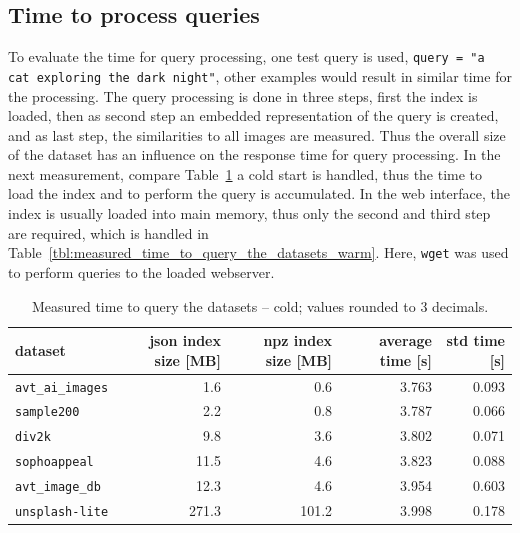 \documentclass{article}
\begin{document}
\subsection{Time to process queries}
To evaluate the time for query processing, one test query is used, \texttt{query = "a cat exploring the dark night"}, other examples would result in similar time for the processing.
The query processing is done in three steps, first the index is loaded, then as second step an embedded representation of the query is created, and as last step, the similarities to all images are measured.
Thus the overall size of the dataset has an influence on the response time for query processing.
In the next measurement, compare Table~\ref{tbl:measured_time_to_query_the_datasets_cold} a cold start is handled, thus the time to load the index and to perform the query is accumulated.
In the web interface, the index is usually loaded into main memory, thus only the second and third step are required, which is handled in Table~\ref{tbl:measured_time_to_query_the_datasets_warm}.
Here, \texttt{wget} was used to perform queries to the loaded webserver.

\begin{table}[htb!]
\centering
\caption{Measured time to query the datasets -- cold; values rounded to 3 decimals.}
\label{tbl:measured_time_to_query_the_datasets_cold}
\begin{tabular}{lrrrr}
\toprule
dataset                  & json index size [MB] & npz index size [MB] & average time [s] & std time [s]  \\
\midrule
\texttt{avt\_ai\_images} & 1.6                  & 0.6                 & 3.763            & 0.093 \\
\texttt{sample200}       & 2.2                  & 0.8                 & 3.787            & 0.066 \\
\texttt{div2k}           & 9.8                  & 3.6                 & 3.802            & 0.071 \\
\texttt{sophoappeal}     & 11.5                 & 4.6                 & 3.823            & 0.088 \\
\texttt{avt\_image\_db}  & 12.3                 & 4.6                 & 3.954            & 0.603 \\
\texttt{unsplash-lite}   & 271.3                & 101.2               & 3.998            & 0.178 \\
\bottomrule
\end{tabular}
\end{table}
\end{document}
